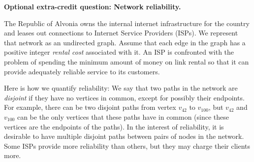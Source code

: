 \documentclass[11pt,addpoints]{exam}
\newcommand{\NPHard}{\NP\text{-Hard}}
\begin{document}
\begin{questions}
  \pagebreak


  \bonusquestion[8] \textbf{Optional extra-credit question: Network reliability.}

  The Republic of Alvonia owns the internal internet infrastructure for the country and leases out connections to Internet Service Providers (ISPs).
  We represent that network as an undirected graph.
  Assume that each edge in the graph has a positive integer \emph{rental cost} associated with it.
  An ISP is confronted with the problem of spending the minimum amount of money on link rental so that it can provide adequately reliable service to its customers.
    
  Here is how we quantify reliability: We say that two paths in the network are \emph{disjoint} if they have no vertices in common, except for possibly their endpoints.
  For example, there can be two disjoint paths from vertex $v_{42}$ to $v_{100}$, but $v_{42}$ and $v_{100}$ can be the only vertices that these paths have in common (since these vertices are the endpoints of the paths).
  In the interest of reliability, it is desirable to have multiple disjoint paths between pairs of nodes in the network.
  Some ISPs provide more reliability than others, but they may charge their clients more.


\end{questions}
\end{document}
